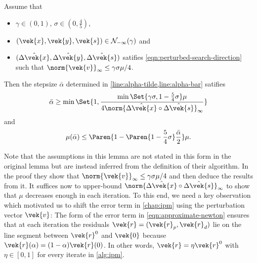 \begin{lemma}\label{thm:alpha-bar-bound}
  Assume that 
  \begin{itemize}
    \item \(\gamma \in (0, 1)\), \(\sigma \in (0, \frac{4}{5})\),
    \item \((\vek{x}, \vek{y}, \vek{s}) \in \mathcal{N}_{-\infty}(\gamma)\) and
    \item \((\hat{\Delta\vek{x}}, \hat{\Delta\vek{y}}, \hat{\Delta\vek{s}})\) satifies \cref{eqn:perturbed-search-direction} such that \(\norm{\vek{v}}_\infty \leq \gamma \sigma \mu / 4\).
  \end{itemize}
  Then the stepsize \(\bar{\alpha}\) determined in \cref{line:alpha-tilde,line:alpha-bar} satifies
  \[ \bar{\alpha} \geq \min \Set{1, \frac{\min \Set{\gamma \sigma, 1 - \frac{5}{4}\sigma} \mu}{4 \norm{\hat{\Delta\vek{x}} \circ \hat{\Delta\vek{s}}}_\infty}} \]
  and
  \[ \mu(\bar{\alpha}) \leq \Paren{1 - \Paren{1 - \frac{5}{4}\sigma} \frac{\bar{\alpha}}{2}} \mu. \]
\end{lemma}

Note that the assumptions in this lemma are not stated in this form in the original lemma but are instead inferred from the definition of their algorithm.
In the proof they show that \(\norm{\vek{v}}_\infty \leq \gamma \sigma \mu / 4\) and then deduce the results from it.
It suffices now to upper-bound \(\norm{\hat{\Delta\vek{x}} \circ \hat{\Delta\vek{s}}}_\infty\) to show that \(\mu\) decreases enough in each iteration.
To this end, we need a key observation which motivated us to shift the error term in \cref{chap:ipm} using the perturbation vector \(\vek{v}\):
The form of the error term in \cref{eqn:approximate-newton} ensures that at each iteration the residuals \(\vek{r} = (\vek{r}_p, \vek{r}_d)\) lie on the line segment between \(\vek{r}^0\) and \(\vek{0}\)
because \(\vek{r}(\alpha) = (1 - \alpha) \vek{r}(0)\).
In other words, \(\vek{r} = \eta \vek{r}^0\) with \(\eta \in [0, 1]\) for every iterate in \cref{alg:ipm}.

